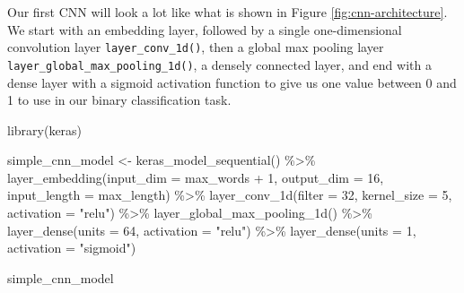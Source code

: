 \documentclass[
]{krantz}
\makeatletter
\newenvironment{Shaded}{\begin{snugshade}}{\end{snugshade}}
\newcommand{\AttributeTok}[1]{\textcolor[rgb]{0.77,0.63,0.00}{#1}}
\newcommand{\DecValTok}[1]{\textcolor[rgb]{0.00,0.00,0.81}{#1}}
\newcommand{\FunctionTok}[1]{\textcolor[rgb]{0.00,0.00,0.00}{#1}}
\newcommand{\NormalTok}[1]{#1}
\newcommand{\OtherTok}[1]{\textcolor[rgb]{0.56,0.35,0.01}{#1}}
\newcommand{\SpecialCharTok}[1]{\textcolor[rgb]{0.00,0.00,0.00}{#1}}
\newcommand{\StringTok}[1]{\textcolor[rgb]{0.31,0.60,0.02}{#1}}
\newenvironment{kframe}{%
\medskip{}
\setlength{\fboxsep}{.8em}
 \def\at@end@of@kframe{}%
 \ifinner\ifhmode%
  \def\at@end@of@kframe{\end{minipage}}%
  \begin{minipage}{\columnwidth}%
 \fi\fi%
 \def\FrameCommand##1{\hskip\@totalleftmargin \hskip-\fboxsep
 \colorbox{shadecolor}{##1}\hskip-\fboxsep
     \hskip-\linewidth \hskip-\@totalleftmargin \hskip\columnwidth}%
 \MakeFramed {\advance\hsize-\width
   \@totalleftmargin\z@ \linewidth\hsize
   \@setminipage}}%
 {\par\unskip\endMakeFramed%
 \at@end@of@kframe}
\renewenvironment{Shaded}{\begin{kframe}}{\end{kframe}}
\makeatother
\begin{document}
Our first CNN will look a lot like what is shown in Figure \ref{fig:cnn-architecture}.
We start with an embedding layer, followed by a single one-dimensional convolution layer \texttt{layer\_conv\_1d()}, then a global max pooling layer \texttt{layer\_global\_max\_pooling\_1d()}, a densely connected layer, and end with a dense layer with a sigmoid activation function to give us one value between 0 and 1 to use in our binary classification task.

\begin{Shaded}
\begin{Highlighting}[]
\FunctionTok{library}\NormalTok{(keras)}

\NormalTok{simple\_cnn\_model }\OtherTok{\textless{}{-}} \FunctionTok{keras\_model\_sequential}\NormalTok{() }\SpecialCharTok{\%\textgreater{}\%}
  \FunctionTok{layer\_embedding}\NormalTok{(}\AttributeTok{input\_dim =}\NormalTok{ max\_words }\SpecialCharTok{+} \DecValTok{1}\NormalTok{, }\AttributeTok{output\_dim =} \DecValTok{16}\NormalTok{,}
                  \AttributeTok{input\_length =}\NormalTok{ max\_length) }\SpecialCharTok{\%\textgreater{}\%}
  \FunctionTok{layer\_conv\_1d}\NormalTok{(}\AttributeTok{filter =} \DecValTok{32}\NormalTok{, }\AttributeTok{kernel\_size =} \DecValTok{5}\NormalTok{, }\AttributeTok{activation =} \StringTok{"relu"}\NormalTok{) }\SpecialCharTok{\%\textgreater{}\%}
  \FunctionTok{layer\_global\_max\_pooling\_1d}\NormalTok{() }\SpecialCharTok{\%\textgreater{}\%}
  \FunctionTok{layer\_dense}\NormalTok{(}\AttributeTok{units =} \DecValTok{64}\NormalTok{, }\AttributeTok{activation =} \StringTok{"relu"}\NormalTok{) }\SpecialCharTok{\%\textgreater{}\%}
  \FunctionTok{layer\_dense}\NormalTok{(}\AttributeTok{units =} \DecValTok{1}\NormalTok{, }\AttributeTok{activation =} \StringTok{"sigmoid"}\NormalTok{)}

\NormalTok{simple\_cnn\_model}
\end{Highlighting}
\end{Shaded}
\end{document}
